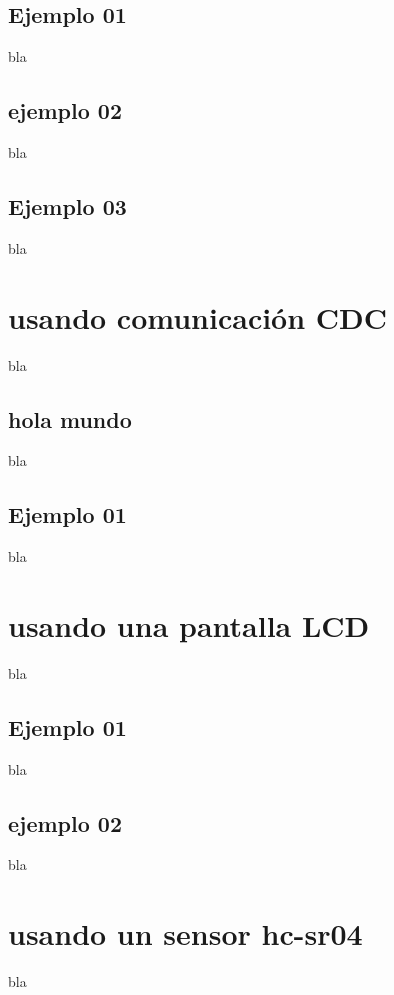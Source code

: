 \documentclass[letterpaper,10pt,english]{sphinxmanual}
\begin{document}
\subsection{Ejemplo 01}
\label{ejemplos:id1}
bla


\subsection{ejemplo 02}
\label{ejemplos:id2}
bla


\subsection{Ejemplo 03}
\label{ejemplos:id3}
bla


\section{usando comunicación CDC}
\label{ejemplos:usando-comunicacion-cdc}
bla


\subsection{hola mundo}
\label{ejemplos:id4}
bla


\subsection{Ejemplo 01}
\label{ejemplos:id5}
bla


\section{usando una pantalla LCD}
\label{ejemplos:usando-una-pantalla-lcd}
bla


\subsection{Ejemplo 01}
\label{ejemplos:id6}
bla


\subsection{ejemplo 02}
\label{ejemplos:id7}
bla


\section{usando un sensor hc-sr04}
\label{ejemplos:usando-un-sensor-hc-sr04}
bla
\end{document}
